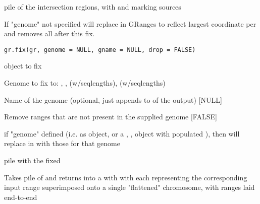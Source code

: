 \documentclass[a4paper]{book}
\begin{document}
%
\begin{Value}
 pile of the intersection regions, with  and  marking sources
\end{Value}
%
\begin{Description}\relax
If "genome" not specified will replace   in GRanges to reflect largest coordinate per 
and removes all  after this fix.
\end{Description}
%
\begin{Usage}
\begin{verbatim}
gr.fix(gr, genome = NULL, gname = NULL, drop = FALSE)
\end{verbatim}
\end{Usage}
%
\begin{Arguments}
\begin{ldescription}
\item[\code{gr}]  object to fix

\item[\code{genome}] Genome to fix to: , ,  (w/seqlengths),  (w/seqlengths)

\item[\code{gname}] Name of the genome (optional, just appends to  of the output) [NULL]

\item[\code{drop}] Remove ranges that are not present in the supplied genome [FALSE]
\end{ldescription}
\end{Arguments}
%
\begin{Details}\relax
if "genome" defined (i.e. as  object, or a , ,  object with populated ),
then will replace  in  with those for that genome
\end{Details}
%
\begin{Value}
 pile with the fixed 
\end{Value}
%
\begin{Description}\relax
Takes pile of  and returns into a  with  with each
representing the corresponding input range superimposed onto a single "flattened"
chromosome, with ranges laid end-to-end
\end{Description}
\end{document}
